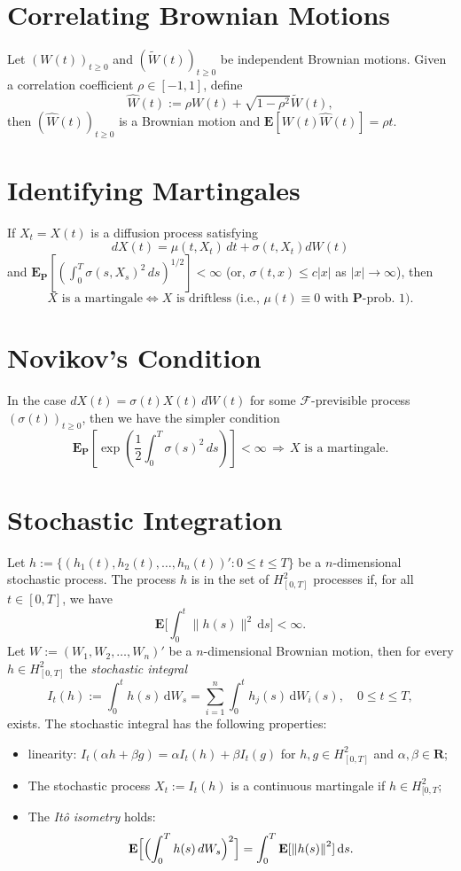 \documentclass[twocolumn]{amsart}
\renewcommand{\P}{\mathbf{P}}
\newcommand{\E}{\mathbf{E}}
\newcommand{\EP}{\mathbf{E}_\mathbf{P}}
\newcommand{\F}{\mathcal{F}}
\newcommand{\R}{\mathbf{R}}
\newcommand{\tW}{\widetilde W}
\newcommand{\ds}{\textrm{d}s}
\renewcommand{\d}{\textrm{d}}
\begin{document}
\section*{Correlating Brownian Motions}
Let $(W(t))_{t \ge 0}$ and $(\tW(t))_{t \ge 0}$ be independent Brownian motions. Given a correlation coefficient $\rho \in [-1,1]$, define
\begin{equation*}
    \widehat W(t) := \rho W(t) + \sqrt{1-\rho^2} \tW(t),
\end{equation*}
then $(\widehat W(t))_{t \ge 0}$ is a Brownian motion and $\E[W(t) \widehat W(t)] = \rho t$.

\section*{Identifying Martingales}

If $X_t = X(t)$ is a diffusion process satisfying $$dX(t) = \mu(t,X_t)\,dt + \sigma(t,X_t) dW(t)$$ and $\EP[(\int_0^T \sigma(s,X_s)^2\,ds)^{1/2}] < \infty$ (or, $\sigma(t,x) \le c |x|$ as $|x| \to \infty$), then
\[ X \text{ is a martingale} \iff X \text{ is driftless (i.e., $\mu(t) \equiv 0$ with $\P$-prob. 1).} \]

\section*{Novikov's Condition}

In the case $dX(t) = \sigma(t) X(t)\,dW(t)$ for some $\F$-previsible process $(\sigma(t))_{t \ge 0}$, then we have the simpler condition
\[ \EP \left[ \exp\left(\frac{1}{2} \int_0^T \sigma(s)^2\,ds\right) \right] < \infty\, \Rightarrow \, X \text{ is a martingale}. \]

\section*{Stochastic Integration}

Let $h := \{(h_1(t), h_2(t), \ldots, h_n(t))' : 0 \le t \le T\}$ be a $n$-dimensional
stochastic process. The process $h$ is in the set of $H_{[0,T]}^2$ processes if, for all $t \in [0,T]$, we have
\[ \E\bigl[\int_0^t \|h(s)\|^2\,\ds \bigr] < \infty. \]
Let $W := (W_1, W_2, \ldots, W_n)'$ be a $n$-dimensional Brownian motion, then for every $h \in H_{[0,T]}^2$ the \emph{stochastic integral}
\[ I_t(h) := \int_0^t h(s)\,\d W_s = \sum_{i=1}^n \int_0^t h_j(s)\,\d W_i(s), \quad 0 \le t \le T, \]
exists. The stochastic integral has the following properties:
\begin{itemize}
	\item linearity: $I_t(\alpha h + \beta g) = \alpha I_t(h) + \beta I_t(g)$ for $h,g \in H_{[0,T]}^2$ and $\alpha,\beta \in \R$;
	\item The stochastic process $X_t := I_t(h)$ is a continuous martingale if $h \in H_{[0,T}^2$;
	\item The \emph{It\^o isometry} holds:
	\[ \E\Bigl[\Bigl(\int_0^T h(s)\,dW_s \Bigr)^2\Bigr] = \int_0^T \E[{\|h(s)\|}^2]\,\ds. \]
\end{itemize}
\end{document}
